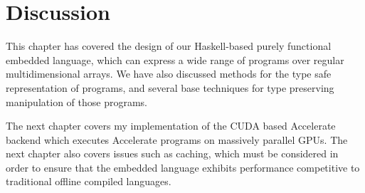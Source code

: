 
\section{Discussion}

This chapter has covered the design of our Haskell-based purely functional
embedded language, which can express a wide range of programs over regular
multidimensional arrays. We have also discussed methods for the type safe
representation of programs, and several base techniques for type preserving
manipulation of those programs.

The next chapter covers my implementation of the CUDA based Accelerate backend
which executes Accelerate programs on massively parallel GPUs. The next chapter
also covers issues such as caching, which must be considered in order to ensure
that the embedded language exhibits performance competitive to traditional
offline compiled languages.

